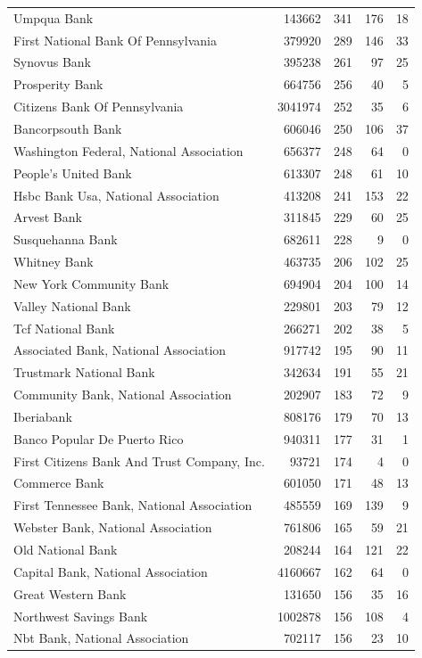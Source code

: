 \begin{tabular}{lrrrr}
Umpqua Bank & 143662 & 341 & 176 & 18\\
First National Bank Of Pennsylvania & 379920 & 289 & 146 & 33\\
Synovus Bank & 395238 & 261 & 97 & 25\\
Prosperity Bank & 664756 & 256 & 40 & 5\\
Citizens Bank Of Pennsylvania & 3041974 & 252 & 35 & 6\\
Bancorpsouth Bank & 606046 & 250 & 106 & 37\\
Washington Federal, National Association & 656377 & 248 & 64 & 0\\
People's United Bank & 613307 & 248 & 61 & 10\\
Hsbc Bank Usa, National Association & 413208 & 241 & 153 & 22\\
Arvest Bank & 311845 & 229 & 60 & 25\\
Susquehanna Bank & 682611 & 228 & 9 & 0\\
Whitney Bank & 463735 & 206 & 102 & 25\\
New York Community Bank & 694904 & 204 & 100 & 14\\
Valley National Bank & 229801 & 203 & 79 & 12\\
Tcf National Bank & 266271 & 202 & 38 & 5\\
Associated Bank, National Association & 917742 & 195 & 90 & 11\\
Trustmark National Bank & 342634 & 191 & 55 & 21\\
Community Bank, National Association & 202907 & 183 & 72 & 9\\
Iberiabank & 808176 & 179 & 70 & 13\\
Banco Popular De Puerto Rico & 940311 & 177 & 31 & 1\\
First Citizens Bank And Trust Company, Inc. & 93721 & 174 & 4 & 0\\
Commerce Bank & 601050 & 171 & 48 & 13\\
First Tennessee Bank, National Association & 485559 & 169 & 139 & 9\\
Webster Bank, National Association & 761806 & 165 & 59 & 21\\
Old National Bank & 208244 & 164 & 121 & 22\\
Capital Bank, National Association & 4160667 & 162 & 64 & 0\\
Great Western Bank & 131650 & 156 & 35 & 16\\
Northwest Savings Bank & 1002878 & 156 & 108 & 4\\
Nbt Bank, National Association & 702117 & 156 & 23 & 10\\

\end{tabular}
